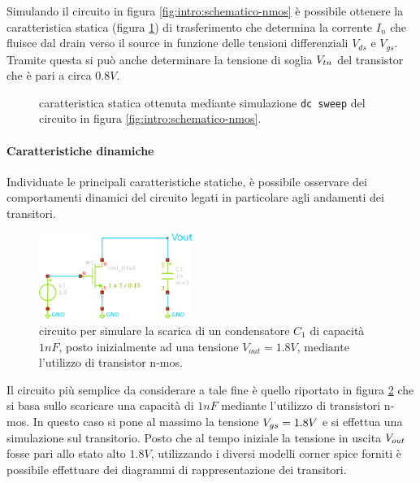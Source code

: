 		Simulando il circuito in figura \ref{fig:intro:schematico-nmos} è possibile ottenere la caratteristica statica (figura \ref{fig:intro:nmos-carattstatica}) di trasferimento che determina la corrente $I_n$ che fluisce dal drain verso il source in funzione delle tensioni differenziali $V_{ds}$ e $V_{gs}$. Tramite questa si può anche determinare la tensione di soglia $V_{tn}$ del transistor che è pari a circa $0.8V$.
		
		\begin{figure}[bht]
			\centering
			
			\caption{caratteristica statica ottenuta mediante simulazione \texttt{dc sweep} del circuito in figura \ref{fig:intro:schematico-nmos}.}
			\label{fig:intro:nmos-carattstatica}
		\end{figure}
		
	
		\paragraph{Caratteristiche dinamiche} Individuate le principali caratteristiche statiche, è possibile osservare dei comportamenti dinamici del circuito legati in particolare agli andamenti dei transitori.
	
		
		\begin{figure}[bht]
			\centering
			\includegraphics[width=5cm]{Immagini/circuito_transitorio.eps}
			\caption{circuito per simulare la scarica di un condensatore $C_1$ di capacità $1nF$, posto inizialmente ad una tensione $V_{out} = 1.8V$, mediante l'utilizzo di transistor n-mos.} \label{fig:intro:schematico-transitorio}
		\end{figure}
	
		Il circuito più semplice da considerare a tale fine è quello riportato in figura \ref{fig:intro:schematico-transitorio} che si basa sullo scaricare una capacità di $1nF$ mediante l'utilizzo di transistori n-mos. In questo caso si pone al massimo la tensione $V_{gs} = 1.8V$ e si effettua una simulazione sul transitorio. Posto che al tempo iniziale la tensione in uscita $V_{out}$ fosse pari allo stato alto $1.8V$, utilizzando i diversi modelli corner spice forniti è possibile effettuare dei diagrammi di rappresentazione dei transitori.
	
